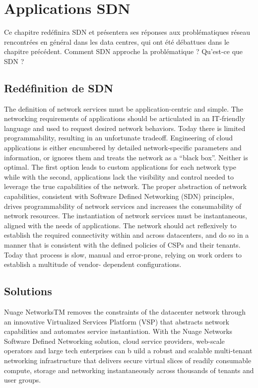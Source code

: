 
\chapter{Applications SDN}

Ce chapitre redéfinira SDN et présentera ses réponses aux problématiques réseau rencontrées en général dans les data centres, qui ont été débattues dans le chapitre précédent. Comment SDN approche la problématique ? Qu'est-ce que SDN ?

\section{Redéfinition de SDN}

The definition of network services must be application-centric and simple. The networking requirements of applications should be articulated in an IT-friendly language and used to request desired network behaviors. Today there is limited programmability, resulting in an unfortunate tradeoff. Engineering of cloud applications is either encumbered by detailed network-specific parameters and information, or ignores them and treats the network as a “black box”. Neither is optimal. The first option leads to custom applications for each network type while with the second, applications lack the visibility and control needed to leverage the true capabilities of the network.
The proper abstraction of network capabilities, consistent with Software Defined Networking (SDN) principles, drives programmability of network services and increases the consumability of network resources.
The instantiation of network services must be instantaneous, aligned with the needs of applications. The network should act reflexively to establish the required connectivity within and across datacenters, and do so in a manner that is consistent with the defined policies of CSPs and their tenants. Today that process is slow, manual and error-prone, relying on work orders to establish a multitude of vendor- dependent configurations.

\section{Solutions}

Nuage NetworksTM removes the constraints of the datacenter network through an innovative Virtualized Services Platform (VSP) that abstracts network capabilities and automates service instantiation. With the Nuage Networks Software Defined Networking solution, cloud service providers, web-scale operators and large tech enterprises can b uild a robust and scalable multi-tenant networking infrastructure that delivers secure virtual slices of readily consumable compute, storage and networking instantaneously across thousands of tenants and user groups.

